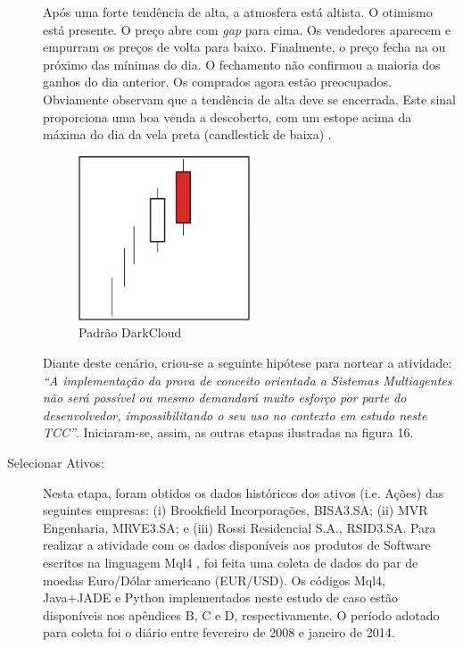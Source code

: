 \begin{description}
\begin{citacao}
Após uma forte tendência de alta, a atmosfera está altista. O otimismo está presente. O preço abre com \textit{gap} para cima. Os vendedores aparecem e empurram os preços de volta para baixo. Finalmente, o preço fecha na ou próximo das mínimas do dia. O fechamento não confirmou a maioria dos ganhos do dia anterior. Os comprados agora estão preocupados. Obviamente observam que a tendência de alta deve se encerrada. Este sinal proporciona uma boa venda a descoberto, com um estope acima da máxima do dia da vela preta (candlestick de baixa) . \newline \cite[p.47]{bigalow2010}

\end{citacao}
\begin{figure}[h!]
\centering
\label{f14}
\includegraphics[width=0.5\textwidth]{figuras/f11}
\caption{Padrão DarkCloud}
\FloatBarrier
\end{figure}

Diante deste cenário, criou-se a seguinte hipótese para nortear a atividade: \textit{“A implementação da prova de conceito orientada a Sistemas Multiagentes não será possível ou mesmo demandará muito esforço por parte do desenvolvedor, impossibilitando o seu uso no contexto em estudo neste TCC”}. Iniciaram-se, assim, as outras etapas ilustradas na figura 16.

\item [Selecionar Ativos:]
Nesta etapa, foram obtidos os dados históricos dos ativos (i.e. Ações) das seguintes empresas: (i) Brookfield Incorporações, BISA3.SA; (ii) MVR Engenharia, MRVE3.SA; e (iii) Rossi Residencial S.A., RSID3.SA. Para realizar a atividade com os dados disponíveis aos produtos de Software escritos na linguagem Mql4 \cite{kovalyov2006}, foi feita uma coleta de dados do par de moedas Euro/Dólar americano (EUR/USD). Os códigos Mql4, Java+JADE e Python implementados neste estudo de caso estão disponíveis nos apêndices B, C e D, respectivamente. O período adotado para coleta foi o diário entre fevereiro de 2008 e janeiro de 2014.


\end{description}
